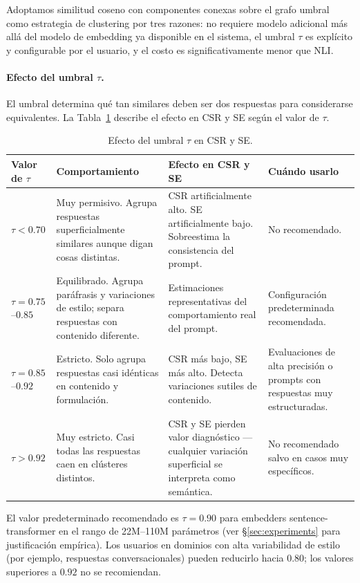 \documentclass[11pt,a4paper]{article}
\begin{document}
Adoptamos similitud coseno con componentes conexas sobre el grafo umbral como estrategia de clustering por tres razones: no requiere modelo adicional más allá del modelo de embedding ya disponible en el sistema, el umbral $\tau$ es explícito y configurable por el usuario, y el costo es significativamente menor que NLI.

\paragraph{Efecto del umbral $\tau$.}
El umbral determina qué tan similares deben ser dos respuestas para considerarse equivalentes. La Tabla~\ref{tab:tau} describe el efecto en CSR y SE según el valor de $\tau$.

\begin{table}[h]
\centering
\caption{Efecto del umbral $\tau$ en CSR y SE.}
\label{tab:tau}
\begin{tabular}{p{2cm} p{3.5cm} p{3.5cm} p{3.5cm}}
\toprule
Valor de $\tau$ & Comportamiento & Efecto en CSR y SE & Cuándo usarlo \\
\midrule
$\tau < 0.70$ &
Muy permisivo. Agrupa respuestas superficialmente similares aunque digan cosas distintas. &
CSR artificialmente alto. SE artificialmente bajo. Sobreestima la consistencia del prompt. &
No recomendado. \\
\addlinespace
$\tau = 0.75$--$0.85$ &
Equilibrado. Agrupa paráfrasis y variaciones de estilo; separa respuestas con contenido diferente. &
Estimaciones representativas del comportamiento real del prompt. &
Configuración predeterminada recomendada. \\
\addlinespace
$\tau = 0.85$--$0.92$ &
Estricto. Solo agrupa respuestas casi idénticas en contenido y formulación. &
CSR más bajo, SE más alto. Detecta variaciones sutiles de contenido. &
Evaluaciones de alta precisión o prompts con respuestas muy estructuradas. \\
\addlinespace
$\tau > 0.92$ &
Muy estricto. Casi todas las respuestas caen en clústeres distintos. &
CSR y SE pierden valor diagnóstico --- cualquier variación superficial se interpreta como semántica. &
No recomendado salvo en casos muy específicos. \\
\bottomrule
\end{tabular}
\end{table}

\noindent El valor predeterminado recomendado es $\tau = 0.90$ para embedders sentence-transformer en el rango de 22M--110M parámetros (ver \S\ref{sec:experiments} para justificación empírica). Los usuarios en dominios con alta variabilidad de estilo (por ejemplo, respuestas conversacionales) pueden reducirlo hacia $0.80$; los valores superiores a $0.92$ no se recomiendan.
\end{document}
